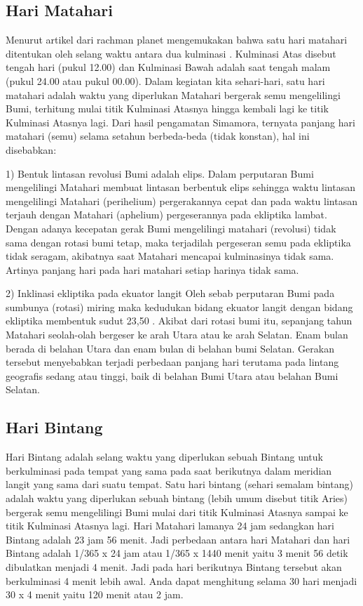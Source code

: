 \subsection{Hari Matahari}
 Menurut artikel dari rachman planet mengemukakan bahwa satu hari matahari ditentukan
 oleh selang waktu antara dua kulminasi \cite{rachmanplanet}. Kulminasi Atas disebut tengah hari (pukul 12.00)
 dan Kulminasi Bawah adalah saat tengah malam (pukul 24.00 atau pukul 00.00). 
 Dalam kegiatan kita sehari-hari, satu hari matahari adalah waktu yang diperlukan
 Matahari bergerak semu mengelilingi Bumi, terhitung mulai titik Kulminasi Atasnya
 hingga kembali lagi ke titik Kulminasi Atasnya lagi. Dari hasil pengamatan Simamora, ternyata 
 panjang hari matahari (semu) selama setahun berbeda-beda (tidak konstan), 
 hal ini disebabkan:
 
 1)	Bentuk lintasan revolusi Bumi adalah elips.
 Dalam perputaran Bumi mengelilingi Matahari membuat lintasan berbentuk elips 
 sehingga waktu lintasan mengelilingi Matahari (perihelium) 
 pergerakannya cepat dan pada waktu lintasan terjauh 
 dengan Matahari (aphelium) pergeserannya pada ekliptika lambat. 
 Dengan adanya kecepatan gerak Bumi mengelilingi matahari (revolusi)
 tidak sama dengan rotasi bumi tetap, maka terjadilah pergeseran semu
 pada ekliptika tidak seragam, akibatnya saat Matahari mencapai 
 kulminasinya tidak sama. Artinya panjang hari pada hari matahari 
 setiap harinya tidak sama.
 
 2)	Inklinasi ekliptika pada ekuator langit
 Oleh sebab perputaran Bumi pada sumbunya (rotasi) miring maka kedudukan
 bidang ekuator langit dengan bidang ekliptika membentuk sudut 23,50 .
 Akibat dari rotasi bumi itu, sepanjang tahun Matahari seolah-olah bergeser ke arah
 Utara atau ke arah Selatan. Enam bulan berada di belahan Utara dan 
 enam bulan di belahan bumi Selatan. Gerakan tersebut menyebabkan 
 terjadi perbedaan panjang hari terutama pada lintang geografis sedang
 atau tinggi, baik di belahan Bumi Utara atau belahan Bumi Selatan.
 
\subsection{Hari Bintang}
Hari Bintang adalah selang waktu yang diperlukan sebuah Bintang untuk berkulminasi 
 pada tempat yang sama pada saat berikutnya dalam meridian langit yang 
 sama dari suatu tempat. Satu hari bintang (sehari semalam bintang) adalah 
 waktu yang diperlukan sebuah bintang (lebih umum disebut titik Aries) bergerak semu
 mengelilingi Bumi mulai dari titik Kulminasi Atasnya sampai ke titik Kulminasi Atasnya 
 lagi. Hari Matahari lamanya 24 jam sedangkan hari Bintang adalah 23 jam 56 menit. 
 Jadi perbedaan antara hari Matahari dan  hari Bintang adalah 1/365 x 24 jam atau 
 1/365 x 1440 menit yaitu 3 menit 56 detik  dibulatkan menjadi 4 menit. 
 Jadi pada hari berikutnya Bintang tersebut akan  berkulminasi 4 menit lebih awal.
 Anda dapat menghitung selama 30 hari menjadi  30 x 4 menit yaitu 120 menit atau 2 jam. 

